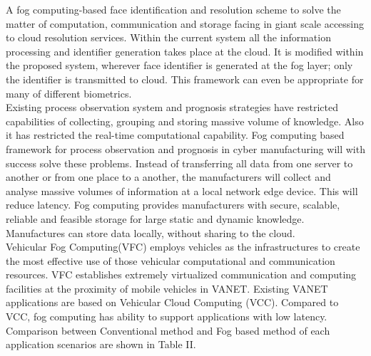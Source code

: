 \documentclass[10pt,a4paper,journal]{IEEEtran}
\begin{document}
\hspace*{2em}	A fog computing-based face identification and resolution scheme to solve the matter of computation, communication and storage facing in giant scale accessing to cloud resolution services. Within the current system all the information processing and identifier generation takes place at the cloud. It is modified within the proposed system, wherever face identifier is generated at the fog layer; only the identifier is transmitted to cloud. This framework can even be appropriate for many of different biometrics.\\
\hspace*{2em}	Existing process observation system and prognosis strategies have restricted capabilities of collecting, grouping and storing massive volume of knowledge. Also it has restricted the real-time computational capability. Fog computing based framework for process observation and prognosis in cyber manufacturing will with success solve these problems. Instead of transferring all data from one server to another or from one place to a another, the manufacturers will collect and analyse massive volumes of information at a local network edge device. This will reduce latency. Fog computing provides manufacturers with secure, scalable, reliable and feasible storage for large static and dynamic knowledge. Manufactures can store data locally, without sharing to the cloud.\\
\hspace*{2em}	Vehicular Fog Computing(VFC) employs vehicles as the infrastructures to create the most effective use of those vehicular computational and communication resources. VFC establishes extremely virtualized communication and computing facilities at the proximity of mobile vehicles in VANET. Existing VANET applications are based on Vehicular Cloud Computing (VCC). Compared to VCC, fog computing has ability to support applications with low latency. Comparison between Conventional method and Fog based method of each application scenarios are shown in Table II.
\end{document}
